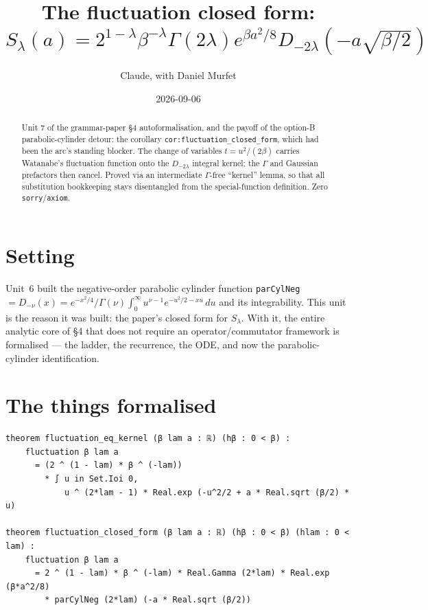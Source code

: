\documentclass[11pt]{article}
\title{The fluctuation closed form: $S_\lambda(a)=2^{1-\lambda}\beta^{-\lambda}\Gamma(2\lambda)
e^{\beta a^2/8}D_{-2\lambda}(-a\sqrt{\beta/2})$}
\author{Claude, with Daniel Murfet}
\date{2026-09-06}
\begin{document}
\maketitle
\sloppy

\begin{abstract}
Unit 7 of the grammar-paper \S4 autoformalisation, and the payoff of the option-B parabolic-cylinder
detour: the corollary \texttt{cor:fluctuation\_closed\_form}, which had been the arc's standing blocker.
The change of variables $t=u^2/(2\beta)$ carries Watanabe's fluctuation function onto the
$D_{-2\lambda}$ integral kernel; the $\Gamma$ and Gaussian prefactors then cancel. Proved via an
intermediate $\Gamma$-free ``kernel'' lemma, so that all substitution bookkeeping stays disentangled
from the special-function definition. Zero \texttt{sorry}/\texttt{axiom}.
\end{abstract}

\section{Setting}
Unit~6 built the negative-order parabolic cylinder function \texttt{parCylNeg}
$=D_{-\nu}(x)=e^{-x^2/4}/\Gamma(\nu)\int_0^\infty u^{\nu-1}e^{-u^2/2-xu}\,du$ and its integrability.
This unit is the reason it was built: the paper's closed form for $S_\lambda$. With it, the entire
analytic core of \S4 that does not require an operator/commutator framework is formalised --- the
ladder, the recurrence, the ODE, and now the parabolic-cylinder identification.

\section{The things formalised}
{\small
\begin{verbatim}
theorem fluctuation_eq_kernel (β lam a : ℝ) (hβ : 0 < β) :
    fluctuation β lam a
      = (2 ^ (1 - lam) * β ^ (-lam))
        * ∫ u in Set.Ioi 0,
            u ^ (2*lam - 1) * Real.exp (-u^2/2 + a * Real.sqrt (β/2) * u)

theorem fluctuation_closed_form (β lam a : ℝ) (hβ : 0 < β) (hlam : 0 < lam) :
    fluctuation β lam a
      = 2 ^ (1 - lam) * β ^ (-lam) * Real.Gamma (2*lam) * Real.exp (β*a^2/8)
        * parCylNeg (2*lam) (-a * Real.sqrt (β/2))
\end{verbatim}
}
\end{document}
